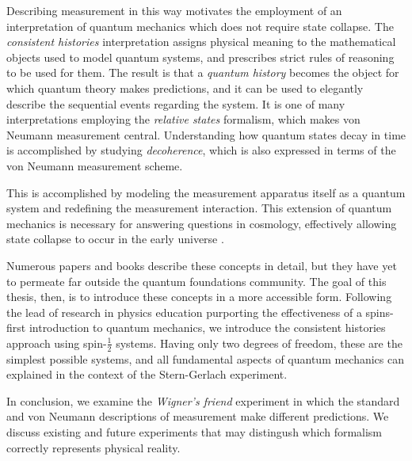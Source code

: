 Describing measurement in this way motivates the employment of an interpretation of quantum mechanics which does not require state collapse. The \textit{consistent histories} interpretation assigns physical meaning to the mathematical objects used to model quantum systems, and prescribes strict rules of reasoning to be used for them. The result is that a \textit{quantum history} becomes the object for which quantum theory makes predictions, and it can be used to elegantly describe the sequential events regarding the system. It is one of many interpretations employing the \textit{relative states} formalism, which makes von Neumann measurement central. Understanding how quantum states decay in time is accomplished by studying \textit{decoherence}, which is also expressed in terms of the von Neumann measurement scheme.


This is accomplished by modeling the measurement apparatus itself as a quantum system and redefining the measurement interaction. This extension of quantum mechanics is necessary for answering questions in cosmology, effectively allowing state collapse to occur in the early universe \cite{Craig}.

Numerous papers and books describe these concepts in detail, but they have yet to permeate far outside the quantum foundations community. The goal of this thesis, then, is to introduce these concepts in a more accessible form. Following the lead of research in physics education purporting the effectiveness of a spins-first introduction to quantum mechanics, we introduce the consistent histories approach using spin-$\frac{1}{2}$ systems. Having only two degrees of freedom, these are the simplest possible systems, and all fundamental aspects of quantum mechanics can explained in the context of the Stern-Gerlach experiment.

In conclusion, we examine the \textit{Wigner's friend} experiment in which the standard and von Neumann descriptions of measurement make different predictions. We discuss existing and future experiments that may distingush which formalism correctly represents physical reality.

